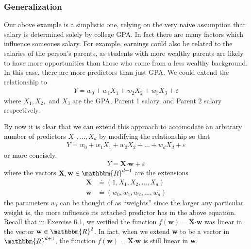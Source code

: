 \documentclass[11pt,letterpaper]{article}
\newcommand\real{\mathbbm{R}}
\newcommand\eps{\varepsilon}
\numberwithin{theorem}{section}
\numberwithin{definition}{section}
\numberwithin{lemma}{section}
\numberwithin{corollary}{section}
\numberwithin{proposition}{section}
\theoremstyle{definition}
\numberwithin{remark}{section}
\numberwithin{claim}{section}
\numberwithin{observation}{section}
\numberwithin{fact}{section}
\numberwithin{assumption}{section}
\numberwithin{example}{section}
\numberwithin{exercise}{section}
\begin{document}
\subsubsection{Generalization}
Our above example is a simplistic one, relying on the very naive assumption that salary is determined solely by college GPA. In fact there are many factors which influence someones salary. For example, earnings could also be related to the salaries of the person's parents, as students with more wealthy parents are likely to have more opportunities than those who come from a less wealthy background. In this case, there are more predictors than just GPA. We could extend the relationship to
\begin{align*}
Y = w_0 + w_1 X_1 + w_2 X_2 + w_3 X_3 + \eps
\end{align*}
where $X_1, X_2,$ and $X_3$ are the GPA, Parent 1 salary, and Parent 2 salary respectively.

By now it is clear that we can extend this approach to accomodate an arbitrary number of predictors $X_1,\dots,X_d$ by modifying the relationship so that
\begin{align*}
Y = w_0 + w_1 X_1 + w_2 X_2 + \dots + w_d X_d + \eps
\end{align*}
or more concisely,
\begin{align*}
Y = \textbf{X} \boldsymbol{\cdot} \textbf{w} + \eps
\end{align*}
where the vectors $\textbf{X},\textbf{w} \in \real^{d+1}$ are the extensions
\begin{align*}
\textbf{X} &\doteq (1,X_1,X_2,\dots,X_d) \\
\textbf{w} &\doteq (w_0,w_1,w_2,\dots,w_d)
\end{align*}
the parameters $w_i$ can be thought of as ``weights'' since the larger any particular weight is, the more influence its attached predictor has in the above equation. Recall that in Exercise 6.1, we verified the function $f(\textbf{w}) = \textbf{X} \boldsymbol{\cdot} \textbf{w}$ was linear in the vector $\textbf{w} \in \real^2$. In fact, when we extend \textbf{w} to be a vector in $\real^{d+1}$, the function $f(\textbf{w}) = \textbf{X} \boldsymbol{\cdot} \textbf{w}$ is still linear in \textbf{w}. 
\end{document}
